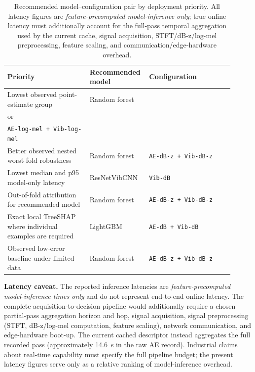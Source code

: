 \begin{table}[htbp]
\centering
\caption{Recommended model--configuration pair by deployment
priority. All latency figures are \emph{feature-precomputed model-inference
only}; true online latency must additionally account for the full-pass temporal aggregation used by the current cache, signal acquisition, STFT/dB-z/log-mel preprocessing, feature
scaling, and communication/edge-hardware overhead.}
\label{tbl:deployment-choice}
\begin{tabular}{@{}>{\raggedright\arraybackslash}p{0.35\linewidth}
                    >{\raggedright\arraybackslash}p{0.20\linewidth}
                    >{\raggedright\arraybackslash}p{0.36\linewidth}@{}}
\toprule
Priority & Recommended model & Configuration \\
\midrule
Lowest observed point-estimate group & Random forest &
\shortstack[l]{\texttt{AE-dB-z + Vib-dB-z}\\or\\\texttt{AE-log-mel + Vib-log-mel}} \\
Better observed nested worst-fold robustness & Random forest & \texttt{AE-dB-z + Vib-dB-z} \\
Lowest median and p95 model-only latency & ResNetVibCNN & \texttt{Vib-dB} \\
Out-of-fold attribution for recommended model & Random forest & \texttt{AE-dB-z + Vib-dB-z} \\
Exact local TreeSHAP where individual examples are required & LightGBM & \texttt{AE-dB + Vib-dB} \\
Observed low-error baseline under limited data & Random forest & \texttt{AE-dB-z + Vib-dB-z} \\
\bottomrule
\end{tabular}
\end{table}

\noindent\textbf{Latency caveat.} The reported inference latencies are
\emph{feature-precomputed model-inference times only} and do not represent
end-to-end online latency. The complete acquisition-to-decision pipeline would
additionally require a chosen partial-pass aggregation horizon and hop,
signal acquisition, signal preprocessing (STFT, dB-z/log-mel computation,
feature scaling), network communication, and edge-hardware boot-up. The
current cached descriptor instead aggregates the full recorded pass
(approximately 14.6~s in the raw AE record). Industrial claims
about real-time capability must specify the full pipeline budget; the present
latency figures serve only as a relative ranking of model-inference overhead.

